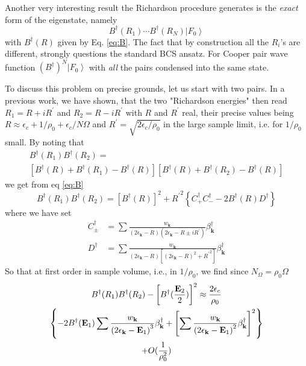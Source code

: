 \documentclass[aps,prb,superscriptaddress,twocolumn]{revtex4}
\newcommand{\vk}{\ensuremath{\mathbf{k}}}
\begin{document}
Another very interesting result the Richardson procedure generates is the 
\emph{exact} form of the eigenstate, namely 
\begin{equation}
B^{\dagger}(R_1)\cdots{}B^{\dagger}(R_N)\left|F_0\right>  
\end{equation}
with $B^{\dagger}(R)$ given by Eq. \eqref{eq:B}. The fact that by
construction all the $R_i$'s are different, strongly questions the standard
BCS ansatz. For Cooper pair wave function $\left(B^{\dagger}\right)
^N\left|F_0\right>  $ with \emph{all} the pairs condensed into the same
state.

To discuss this problem on precise grounds, let us start with two pairs. In
a previous work\cite{combescotBCS}, we have shown, that the two "Richardson
energies" then read $R_1=R+iR^{\prime}$ and $R_2=R-i{}R^{\prime}$ with $R$
and $R^{\prime}$ real, their precise values being $R\approx\epsilon_c+1/%
\rho_0+\epsilon_c/N\Omega$ and $R^{\prime}=\sqrt{2\epsilon_c/\rho_0}$ in the
large sample limit, i.e. for $1/\rho_0$ small. By noting that 
\begin{multline}
B^{\dagger}(R_1)B^{\dagger}(R_2)= \\
\left[B^{\dagger}(R)+B^{\dagger}(R_1)-B^{\dagger}(R)\right] \left[%
B^{\dagger}(R)+B^{\dagger}(R_2)-B^{\dagger}(R)\right] 
\end{multline}
we get from eq \eqref{eq:B} 
\begin{equation}
B^{\dagger}(R_1)B^{\dagger}(R_2)=\left[B^{\dagger}(R)\right]
^2+{R^{\prime}}^2\left\{C^{\dagger}_+C^{\dagger}_--2B^{\dagger}(R)D^{\dagger}%
\right\} 
\end{equation}
where we have set 
\begin{align}
C^{\dagger}_{\pm}&=\sum\frac{w_\vk}{\left(2\epsilon_\vk-R\right)
\left(2\epsilon_\vk-R\pm{}iR^{\prime}\right) }\beta^{\dagger}_\vk \\
D^{\dagger}&=\sum\frac{w_\vk}{\left(2\epsilon_\vk-R\right) \left[%
\left(2\epsilon_\vk-R\right) ^2+{}{R^{\prime}}^2\right] }\beta^{\dagger}_\vk
\end{align}
So that at first order in sample volume, i.e., in $1/\rho_0$, we find since $%
N_\Omega=\rho_0\Omega$ 
\begin{multline}  \label{eq:BB}
B^{\dagger}(R_1)B^{\dagger}(R_2)-\left[B^{\dagger}(\frac{\mathbf{E} _2}{2})%
\right] ^2\approx \frac{2\epsilon_c}{\rho_0} \\
\left\{-2B^{\dagger}(\mathbf{E} _1)\sum\frac{w_\vk}{\left(2\epsilon_\vk-%
\mathbf{E} _1\right) ^3}\beta^{\dagger}_\vk +\left[\sum\frac{w_\vk}{%
\left(2\epsilon_\vk-\mathbf{E} _1\right) ^2}\beta^{\dagger}_\vk\right]
^2\right\}  \\
+O(\frac{1}{\rho_0^2} )
\end{multline}
\end{document}
